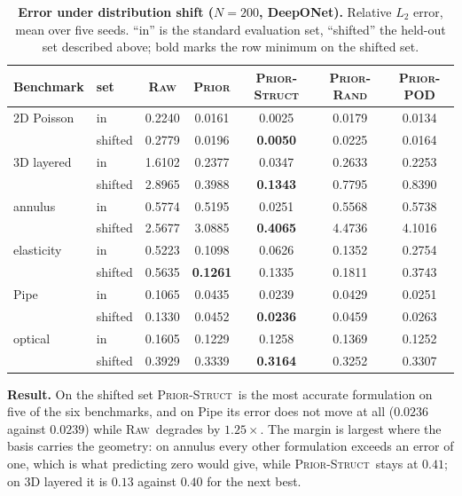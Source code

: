 \documentclass{article}
\newcommand{\armraw}{\textsc{Raw}}
\newcommand{\armprior}{\textsc{Prior}}
\newcommand{\armstruct}{\textsc{Prior-Struct}}
\newcommand{\armrand}{\textsc{Prior-Rand}}
\newcommand{\armpod}{\textsc{Prior-POD}}
\begin{document}
\begin{table}[H]
\centering
\caption{\textbf{Error under distribution shift ($N{=}200$, DeepONet).} Relative $L_2$ error, mean
over five seeds. ``in'' is the standard evaluation set, ``shifted'' the held-out set described
above; bold marks the row minimum on the shifted set.}
\label{tab:ood}
\footnotesize
\setlength{\tabcolsep}{7pt}
\renewcommand{\arraystretch}{0.8}
\vspace{1mm}
\begin{tabular}{@{}llccccc@{}}
\toprule
Benchmark & set & \armraw & \armprior & \armstruct & \armrand & \armpod\\
\midrule
2D Poisson   & in      & 0.2240 & 0.0161 & 0.0025 & 0.0179 & 0.0134\\
             & shifted & 0.2779 & 0.0196 & \textbf{0.0050} & 0.0225 & 0.0164\\
3D layered   & in      & 1.6102 & 0.2377 & 0.0347 & 0.2633 & 0.2253\\
             & shifted & 2.8965 & 0.3988 & \textbf{0.1343} & 0.7795 & 0.8390\\
annulus      & in      & 0.5774 & 0.5195 & 0.0251 & 0.5568 & 0.5738\\
             & shifted & 2.5677 & 3.0885 & \textbf{0.4065} & 4.4736 & 4.1016\\
elasticity   & in      & 0.5223 & 0.1098 & 0.0626 & 0.1352 & 0.2754\\
             & shifted & 0.5635 & \textbf{0.1261} & 0.1335 & 0.1811 & 0.3743\\
Pipe         & in      & 0.1065 & 0.0435 & 0.0239 & 0.0429 & 0.0251\\
             & shifted & 0.1330 & 0.0452 & \textbf{0.0236} & 0.0459 & 0.0263\\
optical      & in      & 0.1605 & 0.1229 & 0.1258 & 0.1369 & 0.1252\\
             & shifted & 0.3929 & 0.3339 & \textbf{0.3164} & 0.3252 & 0.3307\\
\bottomrule
\end{tabular}
\vspace{-3mm}
\end{table}

\textbf{Result.} On the shifted set \armstruct\ is the most accurate formulation on five of the
six benchmarks, and on Pipe its error does not move at all ($0.0236$ against $0.0239$) while
\armraw\ degrades by $1.25\times$. The margin is largest where the basis carries the geometry:
on annulus every other formulation exceeds an error of one, which is what predicting zero would
give, while \armstruct\ stays at $0.41$; on 3D layered it is $0.13$ against $0.40$ for the next
best.
\end{document}
